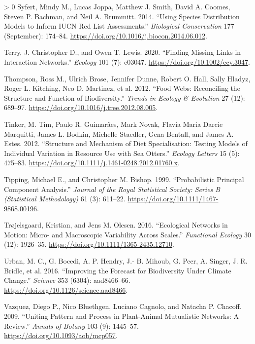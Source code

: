 \documentclass[11pt]{article}
\newlength{\cslhangindent}
\newenvironment{CSLReferences}[3] %
 {%
  \setlength{\parindent}{0pt}
  \ifodd #1 \everypar{\setlength{\hangindent}{\cslhangindent}}\ignorespaces\fi
  \ifnum #2 > 0
  \setlength{\parskip}{#2\baselineskip}
  \fi
 }%
 {}
\begin{document}
\begin{CSLReferences}{1}{0}
\leavevmode\hypertarget{ref-Syfert2014UsiSpe}{}%
Syfert, Mindy M., Lucas Joppa, Matthew J. Smith, David A. Coomes, Steven
P. Bachman, and Neil A. Brummitt. 2014. {``Using Species Distribution
Models to Inform IUCN Red List Assessments.''} \emph{Biological
Conservation} 177 (September): 174--84.
\url{https://doi.org/10.1016/j.biocon.2014.06.012}.

\leavevmode\hypertarget{ref-Terry2020FinMis}{}%
Terry, J. Christopher D., and Owen T. Lewis. 2020. {``Finding Missing
Links in Interaction Networks.''} \emph{Ecology} 101 (7): e03047.
\url{https://doi.org/10.1002/ecy.3047}.

\leavevmode\hypertarget{ref-Thompson2012FooWeb}{}%
Thompson, Ross M., Ulrich Brose, Jennifer Dunne, Robert O. Hall, Sally
Hladyz, Roger L. Kitching, Neo D. Martinez, et al. 2012. {``Food Webs:
Reconciling the Structure and Function of Biodiversity.''} \emph{Trends
in Ecology \& Evolution} 27 (12): 689--97.
\url{https://doi.org/10.1016/j.tree.2012.08.005}.

\leavevmode\hypertarget{ref-Tinker2012StrMec}{}%
Tinker, M. Tim, Paulo R. Guimarães, Mark Novak, Flavia Maria Darcie
Marquitti, James L. Bodkin, Michelle Staedler, Gena Bentall, and James
A. Estes. 2012. {``Structure and Mechanism of Diet Specialisation:
Testing Models of Individual Variation in Resource Use with Sea
Otters.''} \emph{Ecology Letters} 15 (5): 475--83.
\url{https://doi.org/10.1111/j.1461-0248.2012.01760.x}.

\leavevmode\hypertarget{ref-Tipping1999ProPri}{}%
Tipping, Michael E., and Christopher M. Bishop. 1999. {``Probabilistic
Principal Component Analysis.''} \emph{Journal of the Royal Statistical
Society: Series B (Statistical Methodology)} 61 (3): 611--22.
\url{https://doi.org/10.1111/1467-9868.00196}.

\leavevmode\hypertarget{ref-Trojelsgaard2016EcoNet}{}%
Trøjelsgaard, Kristian, and Jens M. Olesen. 2016. {``Ecological Networks
in Motion: Micro- and Macroscopic Variability Across Scales.''}
\emph{Functional Ecology} 30 (12): 1926--35.
\url{https://doi.org/10.1111/1365-2435.12710}.

\leavevmode\hypertarget{ref-Urban2016ImpFor}{}%
Urban, M. C., G. Bocedi, A. P. Hendry, J.- B. Mihoub, G. Peer, A.
Singer, J. R. Bridle, et al. 2016. {``Improving the Forecast for
Biodiversity Under Climate Change.''} \emph{Science} 353 (6304):
aad8466--66. \url{https://doi.org/10.1126/science.aad8466}.

\leavevmode\hypertarget{ref-Vazquez2009UniPat}{}%
Vazquez, Diego P., Nico Bluethgen, Luciano Cagnolo, and Natacha P.
Chacoff. 2009. {``Uniting Pattern and Process in Plant-Animal
Mutualistic Networks: A Review.''} \emph{Annals of Botany} 103 (9):
1445--57. \url{https://doi.org/10.1093/aob/mcp057}.


\end{CSLReferences}
\end{document}
